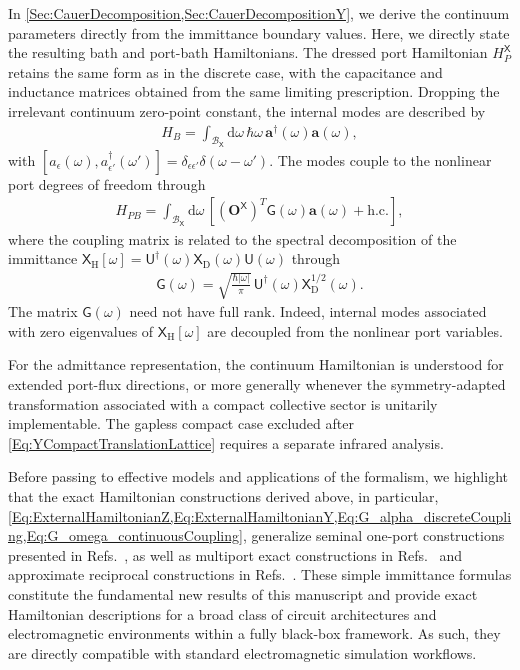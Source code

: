 \documentclass[prx,aps,twocolumn,article]{revtex4-2}
\newcommand{\msf}[1]{\mathsf{#1}}
\newcommand{\bsb}[1]{\boldsymbol{#1}}
\newcommand{\bO}{\bsb{O}}
\newcommand{\ba}{\bsb{a}}
\newcommand{\msG}{\msf{G}}
\newcommand{\msU}{\msf{U}}
\newcommand{\msXD}{\msf{X}_\mathrm{D}}
\newcommand{\msXH}{\msX_\mathrm{H}}
\newcommand{\msX}{\msf{X}}
\begin{document}
In \cref{Sec:CauerDecomposition,Sec:CauerDecompositionY}, we derive the
continuum parameters directly from the immittance boundary values.
Here, we directly state the resulting bath and port-bath Hamiltonians. The dressed port
Hamiltonian $H_P^\msX$ retains the same form as in the discrete case, with the
capacitance and inductance matrices obtained from the same limiting
prescription. Dropping the irrelevant continuum zero-point constant, the internal modes are described by
\begin{align}
    H_B   =  \int_{\mathcal B_{\msX}}\!\mathrm d\omega\,
    \hbar\omega\,
    \ba^\dagger(\omega)\ba(\omega),
    \label{Eq:BathHamiltonianMaintext}
\end{align}
with $[a_\epsilon(\omega),a_{\epsilon'}^\dagger(\omega')]=\delta_{\epsilon\epsilon'}\delta(\omega-\omega')$. The modes couple to the nonlinear port degrees of freedom through
\begin{align}
    H_{PB}
    =
    \int_{\mathcal B_{\msX}}\!\mathrm d\omega\,
    \left[(\bO^{\msX})^T
        \msG(\omega)\ba(\omega)
        + 
        \text{h.c.}\right],
    \label{Eq:BathCouplingMaintext}
\end{align}
where the coupling matrix is related to the spectral decomposition of the immittance
$\msXH[\omega]=\msU^\dagger(\omega)\msXD(\omega)\msU(\omega)$ through
\begin{align}
    \msG(\omega) = \sqrt{\frac{\hbar|\omega|}{\pi}}\,
    \msU^\dagger(\omega)
    \msXD^{1/2}(\omega).
    \label{Eq:G_omega_continuousCoupling}
\end{align}
The matrix $\msG(\omega)$ need not have full rank. Indeed, internal modes associated with zero eigenvalues of $\msXH[\omega]$ are decoupled from the nonlinear port variables.

For the admittance representation, the continuum Hamiltonian is understood for extended port-flux directions, or more generally whenever the symmetry-adapted transformation associated with a compact collective sector is unitarily implementable. The gapless compact case excluded after \cref{Eq:YCompactTranslationLattice} requires a separate infrared analysis.

Before passing to effective models and applications of the formalism, we highlight that the exact Hamiltonian constructions derived above, in particular, \cref{Eq:ExternalHamiltonianZ,Eq:ExternalHamiltonianY,Eq:G_alpha_discreteCoupling,Eq:G_omega_continuousCoupling}, generalize seminal one-port constructions presented in Refs.~\cite{CaldeiraLeggett_QT:1983,Esteve:1986,Devoret:1997,Paladino:2003}, as well as multiport exact constructions in Refs.~\cite{Nigg:2012,Solgun:2015,ParraRodriguez:2019,Solgun:2019,ParraRodriguez:2022,Labarca:2024,ParraRodriguez:2025} and approximate reciprocal constructions in Refs.~\cite{Hassler:2019,Cattaneo:2019,MinevEPR:2021}. These simple immittance formulas constitute the fundamental new results of this manuscript and provide exact Hamiltonian descriptions for a broad class of circuit architectures and electromagnetic environments within a fully black-box framework. As such, they are directly compatible with standard electromagnetic simulation workflows.
\end{document}
